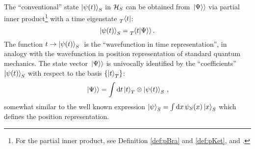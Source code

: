 

The ``conventional'' state $\ket{\psi(t)}_S$ in $\mathcal{H}_S$
can be obtained from $\left.\left| \Psi \right\rangle\right\rangle$ via partial inner product\footnote{
  For the partial inner product,
  see Definition \ref{def:pBra} and \ref{def:pKet},
  and \cite[.3]{QMT_Jacobs}.
}
with a time eigenstate $\prescript{}{T}{\bra{t}}$:
\begin{equation*}
  \ket{\psi(t)}_S = \prescript{}{T}{\!\left.\left\langle t \middle| \Psi \right\rangle\right\rangle} \, \text{.}
\end{equation*}
The function $ t \rightarrow \ket{\psi(t)}_S \; $ is the
``wavefunction in time representation'', in analogy
with the wavefunction in position representation of standard quantum mechanics.
The state vector $\left.\left| \Psi \right\rangle\right\rangle$ is univocally identified by the ``coefficients'' $\ket{\psi(t)}_S$
with respect to the basis $\left\{\ket{t}_T\right\}$:
\begin{equation}\label{eq:pw:}
  \left.\left| \Psi \right\rangle\right\rangle = \int \dd{t} \ket{t}_T \otimes \ket{\psi(t)}_S \, \text{,}
\end{equation}
somewhat similar to the well known expression $\ket{\psi}_S = \int \dd{x} \psi_{S}(x) \ket{x}_S$
which defines the position representation.


